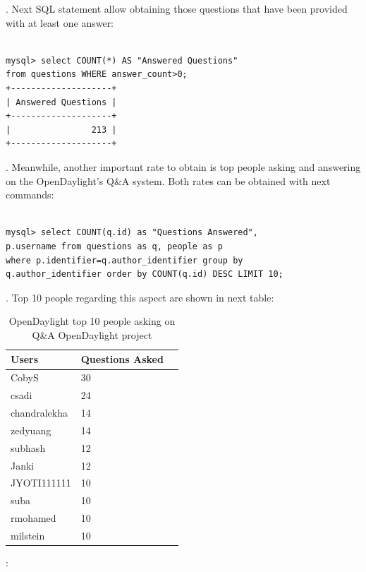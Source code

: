 \documentclass[a4paper, 12pt]{book}
\begin{document}
. Next SQL statement allow obtaining those questions that have been provided with at least one answer:

\begin{verbatim}

mysql> select COUNT(*) AS "Answered Questions"
from questions WHERE answer_count>0;
+--------------------+
| Answered Questions |
+--------------------+
|                213 |
+--------------------+

\end{verbatim}

. Meanwhile, another important rate to obtain is top people asking and answering on the OpenDaylight's Q\&A system. Both rates can be obtained with next commands:

\begin{verbatim}

mysql> select COUNT(q.id) as "Questions Answered",
p.username from questions as q, people as p
where p.identifier=q.author_identifier group by
q.author_identifier order by COUNT(q.id) DESC LIMIT 10;

\end{verbatim}
. Top 10 people regarding this aspect are shown in next table:

\begin{table}[H]
\footnotesize
\begin{center}
\begin{tabular}{|l|l|p{3cm}|}
\hline
\textbf{Users}  & \textbf{Questions Asked} \\ \hline
CobyS         & 30 \\ \hline
csadi         & 24 \\ \hline
chandralekha  & 14 \\ \hline
zedyuang      & 14 \\ \hline
subhash       & 12 \\ \hline
Janki         & 12 \\ \hline
JYOTI111111   & 10 \\ \hline
suba          & 10 \\ \hline
rmohamed      & 10 \\ \hline
milstein      & 10 \\ \hline
\end{tabular}
\end{center}
\caption{OpenDaylight top 10 people asking on Q\&A OpenDaylight project}
\label{tab:odl_top_people_asking}
\end{table}
:
\end{document}
